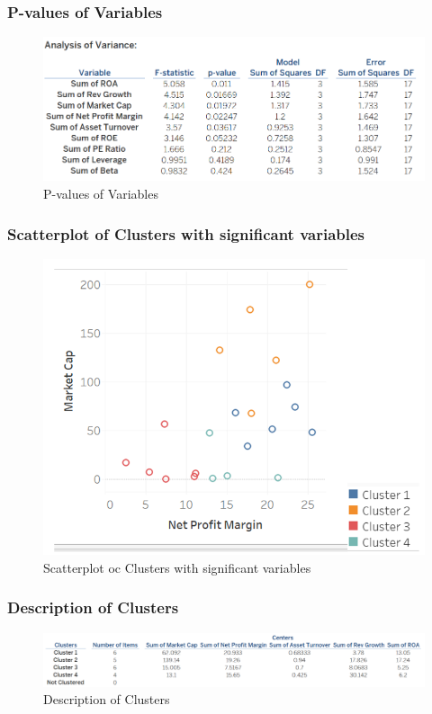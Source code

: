 \documentclass[11pt]{article}
\begin{document}
\subsubsection{P-values of Variables}
\begin{figure}[H]
    \centering
    \includegraphics[width=0.90\columnwidth]{pics/pv.png}
    \caption{P-values of Variables}
    \label{lr}
\end{figure}

\subsubsection{Scatterplot of Clusters with significant variables}
\begin{figure}[H]
    \centering
    \includegraphics[width=0.92\columnwidth]{pics/clust.png}
    \caption{Scatterplot oc Clusters with significant variables}
    \label{lr}
\end{figure}

\subsubsection{Description of Clusters}
\begin{figure}[H]
    \centering
    \includegraphics[width=0.98\columnwidth]{pics/desc.PNG}
    \caption{Description of Clusters }
    \label{lr}
\end{figure}
\end{document}
